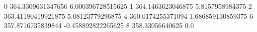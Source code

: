 0 364.3309631347656 6.000396728515625
1 364.1463623046875 5.8157958984375
2 363.41180419921875 5.08123779296875
4 360.0174255371094 1.686859130859375
6 357.8716735839844 -0.458892822265625
8 358.33056640625 0.0
